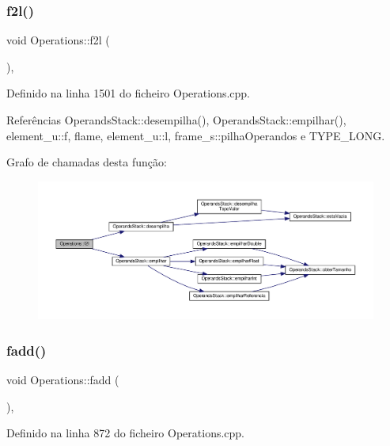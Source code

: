 \subsubsection{\texorpdfstring{f2l()}{f2l()}}
{\footnotesize\ttfamily void Operations\+::f2l (\begin{DoxyParamCaption}{ }\end{DoxyParamCaption})\hspace{0.3cm}{\ttfamily [static]}, {\ttfamily [private]}}



Definido na linha 1501 do ficheiro Operations.\+cpp.



Referências Operands\+Stack\+::desempilha(), Operands\+Stack\+::empilhar(), element\+\_\+u\+::f, flame, element\+\_\+u\+::l, frame\+\_\+s\+::pilha\+Operandos e T\+Y\+P\+E\+\_\+\+L\+O\+NG.

Grafo de chamadas desta função\+:
\nopagebreak
\begin{figure}[H]
\begin{center}
\leavevmode
\includegraphics[width=350pt]{classOperations_a175cdab8d092bdd6c27bace9efbcd27e_cgraph}
\end{center}
\end{figure}
\mbox{\label{classOperations_a01a07c700f0f1574552437b76f3fdcb4}} 
\subsubsection{\texorpdfstring{fadd()}{fadd()}}
{\footnotesize\ttfamily void Operations\+::fadd (\begin{DoxyParamCaption}{ }\end{DoxyParamCaption})\hspace{0.3cm}{\ttfamily [static]}, {\ttfamily [private]}}



Definido na linha 872 do ficheiro Operations.\+cpp.



